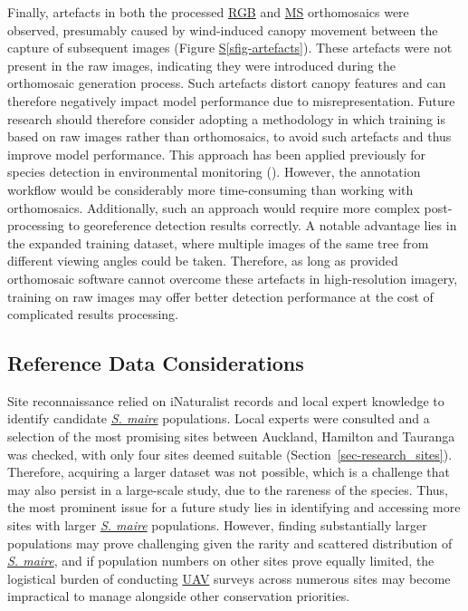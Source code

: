 \documentclass[
]{scrreprt}
\newcommand*\quartosfigref[1]{Figure \hyperref[#1]{S\ref{#1}}}
\begin{document}
Finally, artefacts in both the processed \hyperref[acronyms_RGB]{RGB}
and \hyperref[acronyms_MS]{MS} orthomosaics were observed, presumably
caused by wind-induced canopy movement between the capture of subsequent
images (\quartosfigref{sfig-artefacts}). These artefacts were not
present in the raw images, indicating they were introduced during the
orthomosaic generation process. Such artefacts distort canopy features
and can therefore negatively impact model performance due to
misrepresentation. Future research should therefore consider adopting a
methodology in which training is based on raw images rather than
orthomosaics, to avoid such artefacts and thus improve model
performance. This approach has been applied previously for species
detection in environmental monitoring
().
However, the annotation workflow would be considerably more
time-consuming than working with orthomosaics. Additionally, such an
approach would require more complex post-processing to georeference
detection results correctly. A notable advantage lies in the expanded
training dataset, where multiple images of the same tree from different
viewing angles could be taken. Therefore, as long as provided
orthomosaic software cannot overcome these artefacts in high-resolution
imagery, training on raw images may offer better detection performance
at the cost of complicated results processing.

\subsection{Reference Data
Considerations}\label{reference-data-considerations}

Site reconnaissance relied on iNaturalist records and local expert
knowledge to identify candidate \hyperref[acronyms_SM]{\emph{S. maire}}
populations. Local experts were consulted and a selection of the most
promising sites between Auckland, Hamilton and Tauranga was checked,
with only four sites deemed suitable (Section~\ref{sec-research_sites}).
Therefore, acquiring a larger dataset was not possible, which is a
challenge that may also persist in a large-scale study, due to the
rareness of the species. Thus, the most prominent issue for a future
study lies in identifying and accessing more sites with larger
\hyperref[acronyms_SM]{\emph{S. maire}} populations. However, finding
substantially larger populations may prove challenging given the rarity
and scattered distribution of \hyperref[acronyms_SM]{\emph{S. maire}},
and if population numbers on other sites prove equally limited, the
logistical burden of conducting \hyperref[acronyms_UAV]{UAV} surveys
across numerous sites may become impractical to manage alongside other
conservation priorities.
\end{document}
